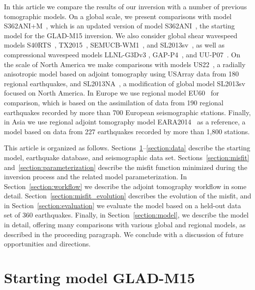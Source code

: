 \documentclass[extra,mreferee]{gji}
\begin{document}
In this article we compare the results of our inversion with a number of previous tomographic models.
On a global scale, we present comparisons with model S362ANI$+$M~\citep{moulik2014anisotropic},
which is an updated version of model S362ANI~\citep{s362ani},
the starting model for the GLAD-M15 inversion.
We also consider global shear wavespeed models S40RTS~\citep{ritsema2011s40rts},
TX2015~\citep{TX2015}, SEMUCB-WM1~\citep{french2015broad},
and SL2013sv~\citep{SchaefferLebedev13},
as well as compressional wavespeed models LLNL-G3Dv3 \citep{simmons2012llnl}, GAP-P4~\citep{fukao2013subducted}, and UU-P07~\citep{van2018atlas}.
On the scale of North America
we make comparisons with models US22~\citep{zhu2017radial},
a radially anisotropic model based on adjoint tomography using USArray data from 180 regional earthquakes,
and SL2013NA~\citep{schaeffer2014imaging},
a modification of global model SL2013sv focused on North America.
In Europe we use regional model EU60~\citep{zhu2015seismic} for comparison,
which is based on the assimilation of data from 190 regional earthquakes recorded by more than 700 European seismographic stations.
Finally, in Asia we use regional adjoint tomography model EARA2014~\citep{chen2015multiparameter} as a reference, a model based on data from 227 earthquakes recorded by more than 1,800 stations.

This article is organized as follows.
Sections~\ref{section:start}--\ref{section:data} describe the starting model,
earthquake database, and seismographic data set. 
Sections~\ref{section:misfit} and~\ref{section:parameterization} describe the misfit function minimized during the inversion process
and the related model parameterization.
In Section~\ref{section:workflow} we describe the adjoint tomography workflow in some detail.
Section~\ref{section:misfit_evolution} describes the evolution of the misfit, and in Section~\ref{section:evaluation} we evaluate the model based on a held-out data set of 360 earthquakes.
Finally, in Section~\ref{section:model}, we describe the model in detail,
offering many comparisons with various global and regional models, as described in the proceeding paragraph.
We conclude with a discussion of future opportunities and directions.

\section{Starting model GLAD-M15}
\label{section:start}
\end{document}
